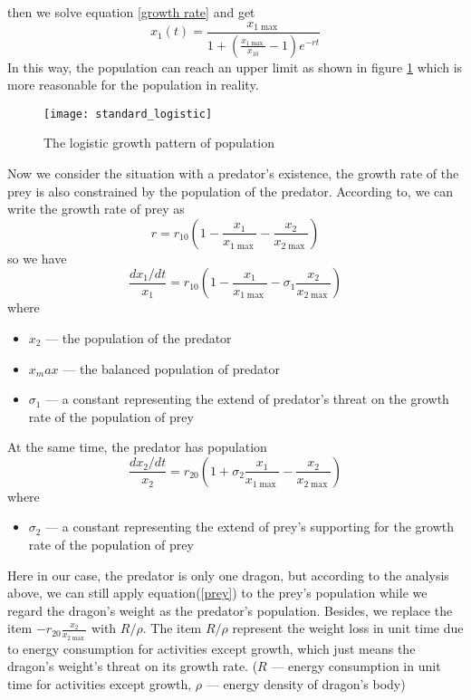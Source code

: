\documentclass{mcmthesis}
\newcommand{\upcite}[1]{\textsuperscript{\textsuperscript{\cite{#1}}}}
\begin{document}
then we solve equation \ref{growth rate} and get
\begin{equation}
x_1(t)=\frac{x_{1\max}}{1+(\frac{x_{1\max}}{x_10}-1)e^{-rt}}
\end{equation}
In this way, the population can reach an upper limit as shown in figure \ref{logistic growth plot} which is more reasonable for the population in reality.
\begin{figure}[h]
\small
\centering
\texttt{[image: standard\_logistic]}
\caption{The logistic growth pattern of population}\label{logistic growth plot}
\end{figure}
Now we consider the situation with a predator's existence, the growth rate of the prey is also constrained by the population of the predator. According to\upcite{chen1988math}, we can write the growth rate of prey as
\begin{equation}
r=r_{10}(1-\frac{x_1}{x_{1\max}}-\frac{x_2}{x_{2\max}})
\end{equation}
so we have
\begin{equation}
\label{prey}	
\frac{dx_1/dt}{x_1}=r_{10}(1-\frac{x_1}{x_{1\max}}-\sigma_1\frac{x_2}{x_{2\max}})
\end{equation}
where\begin{itemize}
\item $x_2$ --- the population of the predator
\item $x_max$ --- the balanced population of predator
\item $\sigma_1$ --- a constant representing the extend of predator's threat on the growth rate of the population of prey
\end{itemize}
At the same time, the predator has population
\begin{equation}
\label{predator}
\frac{dx_2/dt}{x_2}=r_{20}(1+\sigma_2\frac{x_1}{x_{1\max}}-\frac{x_2}{x_{2\max}})
\end{equation}
where\begin{itemize}
\item $\sigma_2$ --- a constant representing the extend of prey's supporting for the growth rate of the population of prey
\end{itemize}
Here in our case, the predator is only one dragon, but according to the analysis above, we can still apply equation(\ref{prey}) to the prey's population while we regard the dragon's weight as the predator's population. Besides, we replace the item $-r_{20}\frac{x_2}{x_{2\max}}$ with $R/\rho$. The item $R/\rho$ represent the weight loss in unit time due to energy consumption for activities except growth, which just means the dragon's weight's threat on its growth rate. ($R$ --- energy consumption in unit time for activities except growth, $\rho$ --- energy density of dragon's body)
\end{document}
